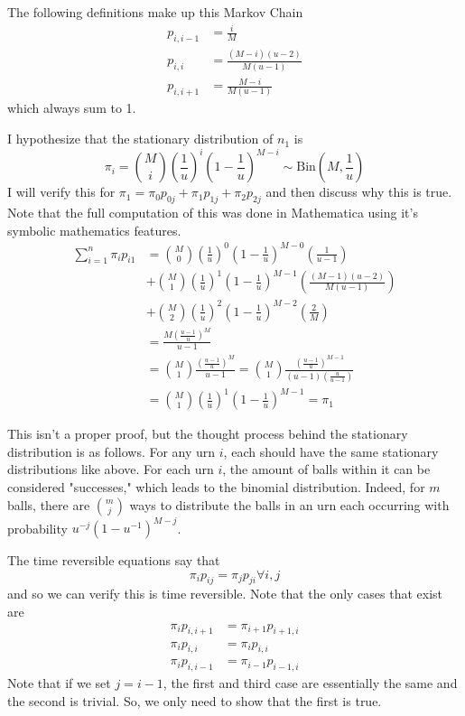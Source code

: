 \documentclass[10pt,a4paper]{exam}
\begin{document}
\begin{questions}
\begin{solution}
The following definitions make up this Markov Chain
\begin{align*}
p_{i,i-1} &= \frac{i}{M}\\
p_{i,i} &= \frac{(M-i)(u-2)}{M(u-1)}\\
p_{i,i+1} &= \frac{M-i}{M(u-1)}
\end{align*}
which always sum to 1.

I hypothesize that the stationary distribution of $n_1$ is $$\pi_i = \binom{M}{i}\left(\frac{1}{u}\right)^i \left(1-\frac{1}{u}\right)^{M-i} \sim \text{Bin}\left(M, \frac{1}{u}\right)$$ I will verify this for $\pi_1 = \pi_0 p_{0j} + \pi_1 p_{1j} + \pi_2 p_{2j}$ and then discuss why this is true. Note that the full computation of this was done in Mathematica using it's symbolic mathematics features.
\begin{align*}
\sum_{i=1}^{n} \pi_i p_{i1}	&= \binom{M}{0}\left(\frac{1}{u}\right)^0 \left(1 - \frac{1}{u}\right)^{M-0} \left(\frac{1}{u-1}\right)\\
		&+ \binom{M}{1}\left(\frac{1}{u}\right)^1 \left(1 - \frac{1}{u}\right)^{M-1} \left(\frac{(M-1)(u-2)}{M(u-1)}   \right)\\
		&+  \binom{M}{2}\left(\frac{1}{u}\right)^2 \left(1 - \frac{1}{u}\right)^{M-2} \left(\frac{2}{M}\right)\\
		&= \frac{M\left(\frac{u-1}{u}\right)^M}{u-1}\\
		&= \binom{M}{1} \frac{\left(\frac{u-1}{u}\right)^M}{u-1} =\binom{M}{1} \frac{\left(\frac{u-1}{u}\right)^{M-1}}{(u-1)\left(\frac{u}{u-1}\right)}\\
		&= \binom{M}{1}\left(\frac{1}{u}\right)^1 \left(1 - \frac{1}{u}\right)^{M-1} = \pi_1
\end{align*}

This isn't a proper proof, but the thought process behind the stationary distribution is as follows. For any urn $i$, each should have the same stationary distributions like above. For each urn $i$, the amount of balls within it can be considered "successes," which leads to the binomial distribution. Indeed, for $m$ balls, there are $\binom{m}{j}$ ways to distribute the balls in an urn each occurring with probability $u^{-j}\left(1-u^{-1}\right)^{M-j}$.

The time reversible equations say that
$$\pi_ip_{ij} = \pi_jp_{ji} \forall i,j$$
and so we can verify this is time reversible. Note that the only cases that exist are
\begin{align*}
\pi_i p_{i,i+1} &= \pi_{i+1} p_{i+1,i}\\
\pi_i p_{i,i} &= \pi_i p_{i,i}\\
\pi_i p_{i,i-1} &= \pi_{i-1} p_{i-1,i}
\end{align*}
Note that if we set $j = i - 1$, the first and third case are essentially the same and the second is trivial. So, we only need to show that the first is true.


\end{solution}
\end{questions}
\end{document}
